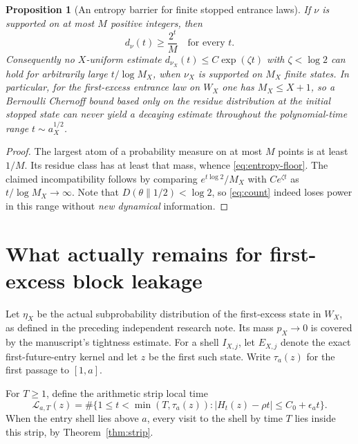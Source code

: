 \documentclass[11pt,a4paper]{article}
\newtheorem{proposition}[theorem]{Proposition}
\theoremstyle{remark}
\begin{document}
\begin{proposition}[An entropy barrier for finite stopped entrance laws]
\label{prop:barrier}
If $\nu$ is supported on at most $M$ positive integers, then
\begin{equation}\label{eq:entropy-floor}
\boxed{\quad d_\nu(t)\ge\frac{2^t}{M}\quad\text{for every }t.\quad}
\end{equation}
Consequently no $X$-uniform estimate $d_{\nu_X}(t)\le
C\exp(\zeta t)$ with $\zeta<\log2$ can hold for
arbitrarily large $t/\log M_X$, when $\nu_X$ is supported on
$M_X$ finite states.  In particular, for the first-excess entrance
law on $W_X$ one has $M_X\le X+1$, so a Bernoulli Chernoff bound based
\emph{only on the residue distribution at the initial stopped state}
can never yield a decaying estimate throughout the polynomial-time
range $t\sim a_X^{1/2}$.
\end{proposition}
\begin{proof}
The largest atom of a probability measure on at most $M$ points is
at least $1/M$.  Its residue class has at least that mass, whence
\eqref{eq:entropy-floor}.  The claimed incompatibility follows by
comparing $e^{t\log2}/M_X$ with $Ce^{\zeta t}$ as
$t/\log M_X\to\infty$.  Note that
$D(\theta\|1/2)<\log2$, so \eqref{eq:count} indeed loses power
in this range without \emph{new dynamical} information.
\end{proof}

\section{What actually remains for first-excess block leakage}
Let $\eta_X$ be the actual subprobability distribution of the
first-excess state in $W_X$, as defined in the preceding independent
research note.  Its mass $p_X\to0$ is covered by the manuscript's
tightness estimate.  For a shell $I_{X,j}$, let $E_{X,j}$ denote the
exact first-future-entry kernel and let $z$ be the first such state.
Write $\tau_a(z)$ for the first passage to $[1,a]$.

For $T\ge1$, define the arithmetic strip local time
\[
 \mathcal L_{a,T}(z)=
 \#\bigl\{1\le t<\min(T,\tau_a(z)):
 |H_t(z)-\rho t|\le C_0+\epsilon_a t\bigr\}.
\]
When the entry shell lies above $a$, every visit to the shell by
time $T$ lies inside this strip, by Theorem~\ref{thm:strip}.
\end{document}
